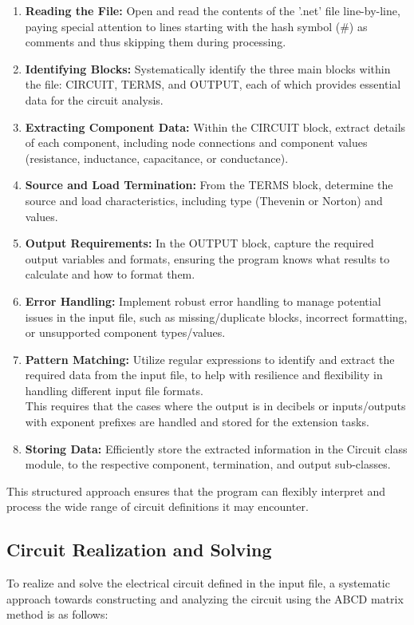 \documentclass[a4paper]{article}
\begin{document}
\begin{enumerate}
    \item \textbf{Reading the File:} Open and read the contents of the '.net' file line-by-line, paying special attention to lines starting with the hash symbol (\#) as comments and thus skipping them during processing.
    \item \textbf{Identifying Blocks:} Systematically identify the three main blocks within the file: CIRCUIT, TERMS, and OUTPUT, each of which provides essential data for the circuit analysis.
    \item \textbf{Extracting Component Data:} Within the CIRCUIT block, extract details of each component, including node connections and component values (resistance, inductance, capacitance, or conductance).
    \item \textbf{Source and Load Termination:} From the TERMS block, determine the source and load characteristics, including type (Thevenin or Norton) and values.
    \item \textbf{Output Requirements:} In the OUTPUT block, capture the required output variables and formats, ensuring the program knows what results to calculate and how to format them.
    \item \textbf{Error Handling:} Implement robust error handling to manage potential issues in the input file, such as missing/duplicate blocks, incorrect formatting, or unsupported component types/values.
    \item \textbf{Pattern Matching:} Utilize regular expressions to identify and extract the required data from the input file, to help with resilience and flexibility in handling different input file formats.\\
    This requires that the cases where the output is in decibels or inputs/outputs with exponent prefixes are handled and stored for the extension tasks.
    \item \textbf{Storing Data:} Efficiently store the extracted information in the Circuit class module, to the respective component, termination, and output sub-classes.
\end{enumerate}

This structured approach ensures that the program can flexibly interpret and process the wide range of circuit definitions it may encounter.

\subsection*{Circuit Realization and Solving}
To realize and solve the electrical circuit defined in the input file, a systematic approach towards constructing and analyzing the circuit using the ABCD matrix method is as follows:
\end{document}
